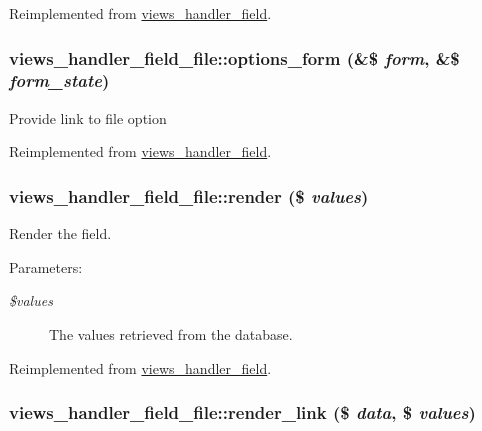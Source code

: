 Reimplemented from \hyperlink{classviews__handler__field_64c69a8a3697603f8283405071c25b76}{views\_\-handler\_\-field}.\hypertarget{classviews__handler__field__file_ab95242357e45be9c4fbbced1f625d7b}{
\subsubsection[{options\_\-form}]{\setlength{\rightskip}{0pt plus 5cm}views\_\-handler\_\-field\_\-file::options\_\-form (\&\$ {\em form}, \/  \&\$ {\em form\_\-state})}}
\label{classviews__handler__field__file_ab95242357e45be9c4fbbced1f625d7b}


Provide link to file option 

Reimplemented from \hyperlink{classviews__handler__field_0435d161922b7b4b84f02a2e79bb947a}{views\_\-handler\_\-field}.\hypertarget{classviews__handler__field__file_624c3ed9f9f4b194e2a9a0b7d6acb384}{
\subsubsection[{render}]{\setlength{\rightskip}{0pt plus 5cm}views\_\-handler\_\-field\_\-file::render (\$ {\em values})}}
\label{classviews__handler__field__file_624c3ed9f9f4b194e2a9a0b7d6acb384}


Render the field.

\begin{Desc}
\item[Parameters:]
\begin{description}
\item[{\em \$values}]The values retrieved from the database. \end{description}
\end{Desc}


Reimplemented from \hyperlink{classviews__handler__field_82ff951c5e9ceb97b2eab86f880cbc1e}{views\_\-handler\_\-field}.\hypertarget{classviews__handler__field__file_01e20dce2e91288a77521c1564754d03}{
\subsubsection[{render\_\-link}]{\setlength{\rightskip}{0pt plus 5cm}views\_\-handler\_\-field\_\-file::render\_\-link (\$ {\em data}, \/  \$ {\em values})}}
\label{classviews__handler__field__file_01e20dce2e91288a77521c1564754d03}


